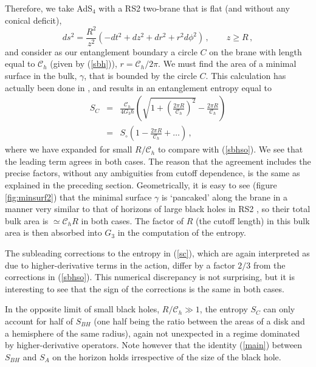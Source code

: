 \documentclass[12pt]{article}
\newcommand{\beq}{\begin{equation}}
\newcommand{\eeq}{\end{equation}}
\newcommand{\beqa}{\begin{eqnarray}}
\newcommand{\eeqa}{\end{eqnarray}}
\newcommand{\reef}[1]{(\ref{#1})}
\begin{document}
Therefore, we take AdS$_4$ with a RS2 two-brane that is flat (and without any
conical deficit), 
\beq
ds^2=\frac{R^2}{z^2}(-dt^2+dz^2+dr^2+r^2 d\phi^2)\,,\qquad z\geq R\,,
\eeq
and consider as our entanglement boundary a circle $C$ on the brane with
length equal to $\mathcal{C}_{h}$ (given by \reef{sbh}),
$r=\mathcal{C}_{h}/2\pi$. We must find the area of a minimal surface in
the bulk, $\gamma$, that is bounded by the circle $C$. This calculation
has actually been done in \cite{ryta}, and results in an entanglement
entropy equal to
\beqa\label{sc}
S_C&=&\frac{\mathcal{C}_{h}}{4G_3\hbar}\left(\sqrt{1+ \left(\frac{2\pi
R}{\mathcal{C}_{h}}\right)^2} -\frac{2\pi
R}{\mathcal{C}_{h}}\right)\nonumber\\
&=&S_{\circ}\left(1-\frac{2\pi R}{\mathcal{C}_{h}}
+\dots
\right)\,,
\eeqa
where we have expanded for small $R/\mathcal{C}_{h}$ to compare with
\reef{sbhso}. We see that the leading term agrees in both cases. The
reason that the agreement includes the precise factors, without any
ambiguities from cutoff dependence, is the same as explained in the
preceding section. Geometrically, it is easy to see (figure
\ref{fig:minsurf2}) that the minimal surface $\gamma$ is `pancaked'
along the brane in a manner very similar to that of horizons of large
black holes in RS2 \cite{ehm1}, so their total bulk area is $\simeq
\mathcal{C}_{h} R$ in both cases. The factor of $R$ (the cutoff length)
in this bulk area is then absorbed into $G_3$ in the computation of the
entropy.

The subleading corrections to the entropy in \reef{sc}, which are again
interpreted as due to higher-derivative terms in the action, differ by a
factor $2/3$ from the corrections in \reef{sbhso}. This numerical
discrepancy is not surprising, but it is interesting to see that the
sign of the corrections is the same in both cases. 

In the opposite limit of small black holes, $R/\mathcal{C}_{h}\gg 1$,
the entropy $S_C$ can only account for half of $S_{BH}$ (one half being
the ratio between the areas of a disk and a hemisphere of the same
radius), again not unexpected in a regime dominated by
higher-derivative operators. Note however that the identity \reef{main}
between $S_{BH}$ and $S_{A}$ on the horizon holds irrespective of the
size of the black hole.


\bigskip
\end{document}
